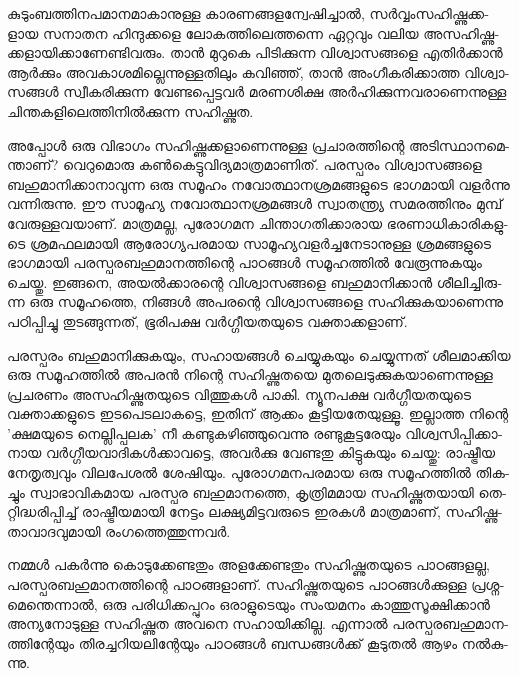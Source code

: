 ­കു­ടും­ബ­ത്തി­ന­പ­മാ­ന­മാ­കാ­നു­ള്ള കാ­ര­ണ­ങ്ങ­ള­ന്വേ­ഷി­ച്ചാല്‍, സര്‍­വ്വം­സ­ഹി­ഷ്ണു­ക്ക­ളായ സനാ­തന ഹി­ന്ദു­ക്ക­ളെ ലോ­ക­ത്തി­ലെ­ത്ത­ന്നെ
 ഏറ്റ­വും വലിയ അസ­ഹി­ഷ്ണു­ക്ക­ളാ­യി­ക്കാ­ണേ­ണ്ടി­വ­രും. താന്‍ മു­റു­കെ പി­ടി­ക്കു­ന്ന വി­ശ്വാ­സ­ങ്ങ­ളെ എതിര്‍­ക്കാന്‍ ആര്‍­ക്കും അവ­കാ­ശ­മി­ല്ലെ­ന്നു­ള്ള­തി­ലും 
 കവി­ഞ്ഞ്, താന്‍ അം­ഗീ­ക­രി­ക്കാ­ത്ത വി­ശ്വാ­സ­ങ്ങള്‍ സ്വീ­ക­രി­ക്കു­ന്ന വേ­ണ്ട­പ്പെ­ട്ട­വര്‍ മര­ണ­ശി­ക്ഷ അര്‍­ഹി­ക്കു­ന്ന­വ­രാ­ണെ­ന്നു­ള്ള 
 ചി­ന്ത­ക­ളി­ലെ­ത്തി­നില്‍­ക്കു­ന്ന സഹി­ഷ്ണു­ത.

അ­പ്പോള്‍ ഒരു വി­ഭാ­ഗം സഹി­ഷ്ണു­ക്ക­ളാ­ണെ­ന്നു­ള്ള പ്ര­ചാ­ര­ത്തി­ന്റെ അടി­സ്ഥാ­ന­മെ­ന്താ­ണ്? വെ­റു­മൊ­രു കണ്‍­കെ­ട്ടു­വി­ദ്യ­മാ­ത്ര­മാ­ണി­ത്. 
പര­സ്പ­രം വി­ശ്വാ­സ­ങ്ങ­ളെ ബഹു­മാ­നി­ക്കാ­നാ­വു­ന്ന ഒരു സമൂ­ഹം നവോ­ത്ഥാ­ന­ശ്ര­മ­ങ്ങ­ളു­ടെ ഭാ­ഗ­മാ­യി വളര്‍­ന്നു വന്നി­രു­ന്നു. ഈ സാ­മൂ­ഹ്യ 
നവോ­ത്ഥാ­ന­ശ്ര­മ­ങ്ങള്‍ സ്വാ­ത­ന്ത്ര്യ സമ­ര­ത്തി­നും മു­മ്പ് വേ­രു­ള്ള­വ­യാ­ണ്. മാ­ത്ര­മ­ല്ല, പു­രോ­ഗ­മന ചി­ന്താ­ഗ­തി­ക്കാ­രായ ഭര­ണാ­ധി­കാ­രി­ക­ളു­ടെ
 ശ്ര­മ­ഫ­ല­മാ­യി ആരോ­ഗ്യ­പ­ര­മായ സാ­മൂ­ഹ്യ­വ­ളര്‍­ച്ച­നേ­ടാ­നു­ള്ള ശ്ര­മ­ങ്ങ­ളു­ടെ ഭാ­ഗ­മാ­യി പര­സ്പ­ര­ബ­ഹു­മാ­ന­ത്തി­ന്റെ പാ­ഠ­ങ്ങള്‍ സമൂ­ഹ­ത്തില്‍ 
 വേ­രൂ­ന്നു­ക­യും ചെ­യ്തു. ഇങ്ങ­നെ, അയല്‍­ക്കാ­ര­ന്റെ വി­ശ്വാ­സ­ങ്ങ­ളെ ബഹു­മാ­നി­ക്കാന്‍ ശീ­ലി­ച്ചി­രു­ന്ന ഒരു സമൂ­ഹ­ത്തെ, നി­ങ്ങള്‍ 
 അപ­ര­ന്റെ വി­ശ്വാ­സ­ങ്ങ­ളെ സഹി­ക്കു­ക­യാ­ണെ­ന്നു പഠി­പ്പി­ച്ചു തു­ട­ങ്ങു­ന്ന­ത്, ഭൂ­രി­പ­ക്ഷ വര്‍­ഗ്ഗീ­യ­ത­യു­ടെ വക്താ­ക്ക­ളാ­ണ്.

­പ­ര­സ്പ­രം ബഹു­മാ­നി­ക്കു­ക­യും, സഹാ­യ­ങ്ങള്‍ ചെ­യ്യു­ക­യും ചെ­യ്യു­ന്ന­ത് ശീ­ല­മാ­ക്കിയ ഒരു സമൂ­ഹ­ത്തില്‍ അപ­രന്‍ നി­ന്റെ സഹി­ഷ്ണു­ത­യെ 
മു­ത­ലെ­ടു­ക്കു­ക­യാ­ണെ­ന്നു­ള്ള പ്ര­ച­ര­ണം അസ­ഹി­ഷ്ണു­ത­യു­ടെ വി­ത്തു­കള്‍ പാ­കി. ന്യൂ­ന­പ­ക്ഷ വര്‍­ഗ്ഗീ­യ­ത­യു­ടെ വക്താ­ക്ക­ളു­ടെ ഇട­പെ­ട­ലാ­ക­ട്ടെ, 
ഇതി­ന് ആക്കം കൂ­ട്ടി­യ­തേ­യു­ള്ളൂ. ഇല്ലാ­ത്ത നി­ന്റെ 'ക്ഷ­മ­യു­ടെ നെ­ല്ലി­പ്പ­ല­ക' നീ കണ്ടു­ക­ഴി­ഞ്ഞു­വെ­ന്നു രണ്ടു­കൂ­ട്ട­രേ­യും വി­ശ്വ­സി­പ്പി­ക്കാ­നായ
 വര്‍­ഗ്ഗീ­യ­വാ­ദി­കള്‍­ക്കാ­വ­ട്ടെ, അവര്‍­ക്കു വേ­ണ്ട­തു കി­ട്ടു­ക­യും ചെ­യ്തു: രാ­ഷ്ട്രീയ നേ­തൃ­ത്വ­വും വി­ല­പേ­ശല്‍ ശേ­ഷി­യും. പു­രോ­ഗ­മ­ന­പ­ര­മായ
  ഒരു സമൂ­ഹ­ത്തില്‍ തി­ക­ച്ചും സ്വാ­ഭാ­വി­ക­മായ പര­സ്പര ബഹു­മാ­ന­ത്തെ, കൃ­ത്രി­മ­മായ സഹി­ഷ്ണു­ത­യാ­യി തെ­റ്റി­ദ്ധ­രി­പ്പി­ച്ച് രാ­ഷ്ട്രീ­യ­മാ­യി 
  നേ­ട്ടം ലക്ഷ്യ­മി­ട്ട­വ­രു­ടെ ഇര­കള്‍ മാ­ത്ര­മാ­ണ്, സഹി­ഷ്ണു­താ­വാ­ദ­വു­മാ­യി രം­ഗ­ത്തെ­ത്തു­ന്ന­വര്‍.

­ന­മ്മള്‍ പകര്‍­ന്നു കൊ­ടു­ക്കേ­ണ്ട­തും അള­ക്കേ­ണ്ട­തും സഹി­ഷ്ണു­ത­യു­ടെ പാ­ഠ­ങ്ങ­ള­ല്ല, പര­സ്പ­ര­ബ­ഹു­മാ­ന­ത്തി­ന്റെ പാ­ഠ­ങ്ങ­ളാ­ണ്. സഹി­ഷ്ണു­ത­യു­ടെ 
പാ­ഠ­ങ്ങള്‍­ക്കു­ള്ള പ്ര­ശ്ന­മെ­ന്തെ­ന്നാല്‍, ഒരു പരി­ധി­ക്ക­പ്പു­റം ഒരാ­ളു­ടെ­യും സം­യ­മ­നം കാ­ത്തു­സൂ­ക്ഷി­ക്കാന്‍ അന്യ­നോ­ടു­ള്ള ­സ­ഹി­ഷ്ണു­ത 
അവ­നെ സഹാ­യി­ക്കി­ല്ല. എന്നാല്‍ പര­സ്പ­ര­ബ­ഹു­മാ­ന­ത്തി­ന്റേ­യും തി­ര­ച്ച­റി­യ­ലി­ന്റേ­യും പാ­ഠ­ങ്ങള്‍ ബന്ധ­ങ്ങള്‍­ക്ക് കൂ­ടു­തല്‍ ആഴം നല്‍­കു­ന്നു­.

